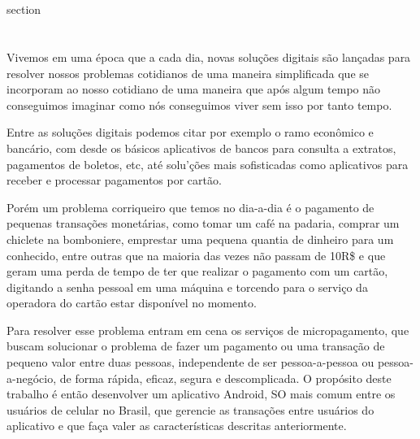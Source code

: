 \documentclass[hidelinks,12pt]{article}
\begin{document}
\section*{}
section
\newpage
{}
\section*{}

Vivemos em uma \'epoca que a cada dia, novas solu\c{c}\~oes digitais s\~ao lan\c{c}adas para resolver nossos problemas cotidianos de uma maneira simplificada que se incorporam ao nosso cotidiano de uma maneira que ap\'os algum tempo n\~ao conseguimos imaginar como n\'os conseguimos viver sem isso por tanto tempo.

Entre as solu\c{c}\~oes digitais podemos citar por exemplo o ramo econ\^omico e banc\'ario, com desde os b\'asicos aplicativos de bancos para consulta a extratos, pagamentos de boletos, etc, at\'e solu'\c{c}\~oes mais sofisticadas como aplicativos para receber e processar pagamentos por cart\~ao.

Por\'em um problema corriqueiro que temos no dia-a-dia \'e o pagamento de pequenas transa\c{c}\~oes monet\'arias, como tomar um caf\'e na padaria, comprar um chiclete na bomboniere, emprestar uma pequena quantia de dinheiro para um conhecido, entre outras que na maioria das vezes n\~ao passam de 10R\$ e que geram uma perda de tempo de ter que realizar o pagamento com um cart\~ao, digitando a senha pessoal em uma m\'aquina e torcendo para o servi\c{c}o da operadora do cart\~ao estar disponível no momento.

Para resolver esse problema entram em cena os servi\c{c}os de micropagamento, que buscam solucionar o problema de fazer um pagamento ou uma transa\c{c}\~ao de pequeno valor entre duas pessoas, independente de ser pessoa-a-pessoa ou pessoa-a-neg\'ocio, de forma r\'apida, eficaz, segura e descomplicada. O prop\'osito deste trabalho \'e ent\~ao desenvolver um aplicativo Android, SO mais comum entre os usu\'arios de celular no Brasil, que gerencie as transações entre usu\'arios do aplicativo e que fa\c{c}a valer as caracter\'isticas descritas anteriormente.
\newline
\end{document}

